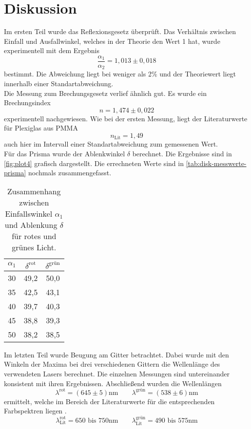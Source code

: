 \section{Diskussion}
\label{sec:Diskussion}
Im ersten Teil wurde das Reflexionsgesetz überprüft. Das Verhältnis zwischen Einfall und
Ausfallwinkel, welches in der Theorie den Wert 1 hat, wurde experimentell mit dem
Ergebnis
\begin{equation}
	\frac{\alpha_1}{\alpha_2} = 1,013 \pm 0,018
\end{equation}
bestimmt. Die Abweichung liegt bei weniger als 2\% und der Theoriewert liegt innerhalb
einer Standartabweichung.
\\
Die Messung zum Brechungsgesetz verlief ähnlich gut. Es wurde ein Brechungsindex 
\begin{equation}
	n = 1,474 \pm 0,022
\end{equation}
experimentell nachgewiesen. Wie bei der ersten Messung, liegt der Literaturwerte für
Plexiglas aus PMMA 
\begin{equation}
	n_\text{Lit} = 1,49
\end{equation}
auch hier im Intervall einer Standartabweichung zum gemessenen Wert.
\\
Für das Prisma wurde der Ablenkwinkel $\delta$ berechnet. Die Ergebnisse sind in
\autoref{fig:plot4} grafisch dargestellt. Die errechneten Werte sind in 
\autoref{tab:disk-messwerte-prisma} nochmals zusammengefasst.
\begin{table}[H]
	\centering
	\caption{Zusammenhang zwischen Einfallswinkel $\alpha_1$ und Ablenkung $\delta$
	für rotes und grünes Licht.}
	\label{tab:disk-messwerte-prisma}
	\begin{tabular}{c c c}
		\toprule
		$\alpha_1$ &
		$\delta^\text{rot}$ &
		$\delta^\text{grün}$ \\
		\midrule
		30 & 49,2 & 50,0	\\
		35 & 42,5 & 43,1	\\
		40 & 39,7 & 40,3	\\
		45 & 38,8 & 39,3	\\
		50 & 38,2 & 38,5	\\
		\bottomrule
	\end{tabular}
\end{table}
\noindent
Im letzten Teil wurde Beugung am Gitter betrachtet. Dabei wurde mit den Winkeln der Maxima
bei drei verschiedenen Gittern die Wellenlänge des verwendeten Lasers berechnet. Die
einzelnen Messungen sind untereinander konsistent mit ihren Ergebnissen. Abschließend
wurden die Wellenlängen
\[
	\lambda^\text{rot} = (645 \pm 5) \si{\nano\meter}
	\qquad
	\lambda^\text{grün} = (538 \pm 6) \si{\nano\meter}
\] 
ermittelt, welche im Bereich der Literaturwerte für die entsprechenden Farbspektren liegen
\cite{frustfrei}.
\begin{equation}
	\lambda_\text{Lit}^\text{rot} = 650 \text{ bis } 750 \si{\nano\meter}
	\qquad
	\lambda_\text{Lit}^\text{grün} = 490 \text{ bis } 575 \si{\nano\meter}
\end{equation}

